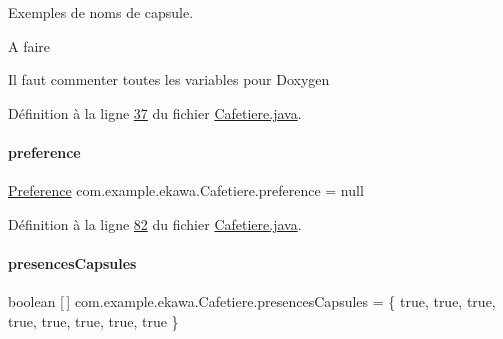Exemples de noms de capsule. 

\begin{DoxyRefDesc}{A faire}
\item[\hyperlink{todo__todo000001}{A faire}]Il faut commenter toutes les variables pour Doxygen \end{DoxyRefDesc}


Définition à la ligne \hyperlink{_cafetiere_8java_source_l00037}{37} du fichier \hyperlink{_cafetiere_8java_source}{Cafetiere.\+java}.

\mbox{\label{classcom_1_1example_1_1ekawa_1_1_cafetiere_aee3f9b78df63bc8dd73bf564954d51ca}} 
\paragraph{\texorpdfstring{preference}{preference}}
{\footnotesize\ttfamily \hyperlink{classcom_1_1example_1_1ekawa_1_1_preference}{Preference} com.\+example.\+ekawa.\+Cafetiere.\+preference = null\hspace{0.3cm}{\ttfamily [private]}}



Définition à la ligne \hyperlink{_cafetiere_8java_source_l00082}{82} du fichier \hyperlink{_cafetiere_8java_source}{Cafetiere.\+java}.

\mbox{\label{classcom_1_1example_1_1ekawa_1_1_cafetiere_aebaaf300362a258e047ae31b7e56e622}} 
\paragraph{\texorpdfstring{presences\+Capsules}{presencesCapsules}}
{\footnotesize\ttfamily boolean \mbox{[}$\,$\mbox{]} com.\+example.\+ekawa.\+Cafetiere.\+presences\+Capsules = \{ true, true, true, true, true, true, true, true \}\hspace{0.3cm}{\ttfamily [private]}}



